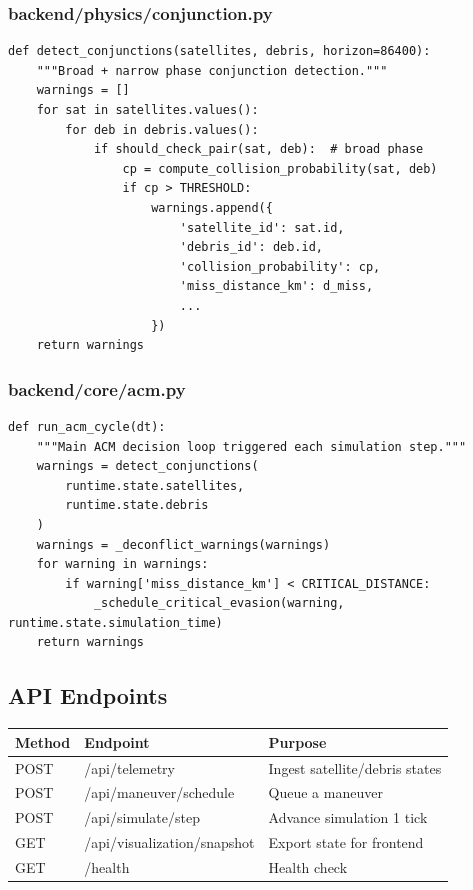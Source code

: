 \documentclass[11pt,a4paper]{article}
\begin{document}
\subsubsection{backend/physics/conjunction.py}
\begin{lstlisting}
def detect_conjunctions(satellites, debris, horizon=86400):
    """Broad + narrow phase conjunction detection."""
    warnings = []
    for sat in satellites.values():
        for deb in debris.values():
            if should_check_pair(sat, deb):  # broad phase
                cp = compute_collision_probability(sat, deb)
                if cp > THRESHOLD:
                    warnings.append({
                        'satellite_id': sat.id,
                        'debris_id': deb.id,
                        'collision_probability': cp,
                        'miss_distance_km': d_miss,
                        ...
                    })
    return warnings
\end{lstlisting}

\subsubsection{backend/core/acm.py}
\begin{lstlisting}
def run_acm_cycle(dt):
    """Main ACM decision loop triggered each simulation step."""
    warnings = detect_conjunctions(
        runtime.state.satellites,
        runtime.state.debris
    )
    warnings = _deconflict_warnings(warnings)
    for warning in warnings:
        if warning['miss_distance_km'] < CRITICAL_DISTANCE:
            _schedule_critical_evasion(warning, runtime.state.simulation_time)
    return warnings
\end{lstlisting}

\subsection{API Endpoints}

\begin{table}[h!]
\centering
\begin{tabular}{|l|l|p{5cm}|}
\hline
\textbf{Method} & \textbf{Endpoint} & \textbf{Purpose} \\
\hline
POST & /api/telemetry & Ingest satellite/debris states \\
POST & /api/maneuver/schedule & Queue a maneuver \\
POST & /api/simulate/step & Advance simulation 1 tick \\
GET & /api/visualization/snapshot & Export state for frontend \\
GET & /health & Health check \\
\hline
\end{tabular}
\end{table}
\end{document}
